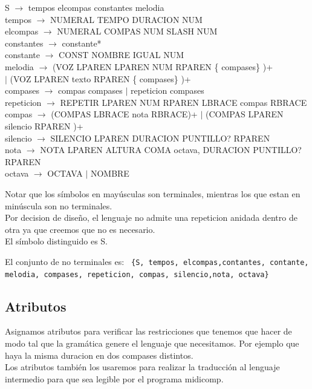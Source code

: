 \documentclass[a4paper]{article}
\begin{document}
S $\rightarrow$ tempos elcompas constantes melodia \\
tempos $\rightarrow$ NUMERAL TEMPO DURACION NUM \\
elcompas $\rightarrow$  NUMERAL COMPAS NUM SLASH NUM \\
constantes $\rightarrow$  constante* \\
constante $\rightarrow$  CONST NOMBRE IGUAL NUM \\
melodia $\rightarrow$  (VOZ LPAREN LPAREN NUM RPAREN \{ compases\} )+ \\$|$ (VOZ LPAREN texto RPAREN \{ compases\} )+ \\
compases $\rightarrow$ compas compases $|$ repeticion compases \\
repeticion $\rightarrow$ REPETIR LPAREN NUM RPAREN LBRACE compas RBRACE \\
compas $\rightarrow$ (COMPAS LBRACE nota RBRACE)+ $|$ (COMPAS LPAREN silencio RPAREN )+ \\
silencio $\rightarrow$ SILENCIO LPAREN DURACION PUNTILLO? RPAREN  \\
nota $\rightarrow$ NOTA LPAREN ALTURA COMA octava, DURACION PUNTILLO? RPAREN  \\
octava $\rightarrow$ OCTAVA $|$ NOMBRE \linebreak

Notar que los símbolos en mayúsculas son terminales, mientras los que estan en minúscula son no terminales.\\
Por decision de diseño, el lenguaje no admite una repeticion anidada dentro de otra ya que 
creemos que no es necesario.\\



El símbolo distinguido es S.\linebreak



El conjunto de no terminales es:\linebreak
\texttt{
\{S, tempos, elcompas,contantes, contante, melodia, compases, repeticion, compas, silencio,nota, octava\}  \\
}



\subsection{Atributos}

Asignamos atributos para verificar las restricciones que tenemos que hacer de modo tal que la gramática genere el lenguaje que necesitamos.
Por ejemplo que haya la misma duracion en dos compases distintos.\\
Los atributos también los usaremos para realizar la traducción al lenguaje intermedio para que sea legible por el programa midicomp. \linebreak
\end{document}
